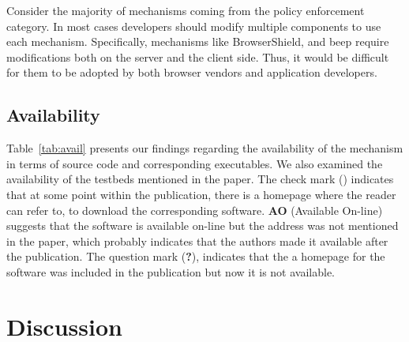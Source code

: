 \documentclass[conference]{IEEEtran}
\newcommand{\tick}{\ding{52}}
\begin{document}
Consider the majority of mechanisms coming from
the policy enforcement category. In most cases
developers should modify multiple components
to use each mechanism. Specifically, mechanisms like
BrowserShield, and {\sc beep} require modifications
both on the server and the client side.
Thus, it would be difficult for them to be adopted by
both browser vendors and application developers.

\subsection{Availability}

Table~\ref{tab:avail} presents our findings regarding the availability
of the mechanism in terms of source code and corresponding
executables. We also examined the availability of the testbeds
mentioned in the paper. The check mark (\tick) indicates that at some
point within the publication, there is a homepage where the reader can
refer to, to download the corresponding software. {\bf AO} (Available
On-line) suggests that the software is available on-line but the
address was not mentioned in the paper, which probably indicates that
the authors made it available after the publication. The question mark
({\bf ?}), indicates that the a homepage for the software was included
in the publication but now it is not available.

\section{Discussion}
\end{document}
